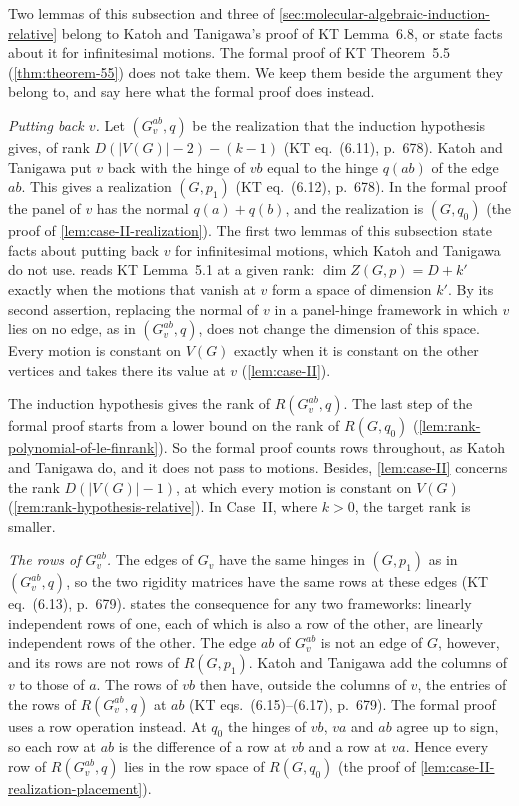 \begin{remark}
  \label{rem:case-II-kt-steps}
  Two lemmas of this subsection and three of
  \cref{sec:molecular-algebraic-induction-relative} belong to Katoh and
  Tanigawa's proof of KT Lemma~6.8, or state facts about it for
  infinitesimal motions. The formal proof of KT Theorem~5.5
  (\cref{thm:theorem-55}) does not take them. We keep them beside the
  argument they belong to, and say here what the formal proof does
  instead.

  \emph{Putting back $v$.} Let $(G_v^{ab}, q)$ be the realization that
  the induction hypothesis gives, of rank $D(|V(G)| - 2) - (k - 1)$ (KT
  eq.~(6.11), p.~678). Katoh and Tanigawa put $v$ back with the hinge
  of $vb$ equal to the hinge $q(ab)$ of the edge $ab$. This gives a
  realization $(G, p_1)$ (KT eq.~(6.12), p.~678). In the formal proof
  the panel of $v$ has the normal $q(a) + q(b)$, and the realization is
  $(G, q_0)$ (the proof of \cref{lem:case-II-realization}). The first
  two lemmas of this subsection state facts about putting back $v$ for
  infinitesimal motions, which Katoh and Tanigawa do not use.
   reads KT Lemma~5.1 at a given rank:
  $\dim Z(G,p) = D + k'$ exactly when the motions that vanish at $v$
  form a space of dimension $k'$. By its second assertion, replacing the
  normal of $v$ in a panel-hinge framework in which $v$ lies on no edge,
  as in $(G_v^{ab}, q)$, does not change the dimension of this space.
  Every motion is constant on $V(G)$ exactly when it is constant on the
  other vertices and takes there its value at $v$ (\cref{lem:case-II}).

  The induction hypothesis gives the rank of $R(G_v^{ab}, q)$. The last
  step of the formal proof starts from a lower bound on the rank of
  $R(G, q_0)$ (\cref{lem:rank-polynomial-of-le-finrank}). So the formal
  proof counts rows throughout, as Katoh and Tanigawa do, and it does not
  pass to motions. Besides, \cref{lem:case-II} concerns the rank
  $D(|V(G)| - 1)$, at which every motion is constant on $V(G)$
  (\cref{rem:rank-hypothesis-relative}). In Case~II, where $k > 0$, the
  target rank is smaller.

  \emph{The rows of $G_v^{ab}$.} The edges of $G_v$ have the same hinges
  in $(G, p_1)$ as in $(G_v^{ab}, q)$, so the two rigidity matrices
  have the same rows at these edges (KT eq.~(6.13), p.~679).
   states the consequence for any
  two frameworks: linearly independent rows of one, each of which is
  also a row of the other, are linearly independent rows of the other.
  The edge $ab$ of $G_v^{ab}$ is not an edge of $G$, however, and its
  rows are not rows of $R(G, p_1)$. Katoh and Tanigawa add the columns
  of $v$ to those of $a$. The rows of $vb$ then have, outside the
  columns of $v$, the entries of the rows of $R(G_v^{ab}, q)$ at $ab$
  (KT eqs.~(6.15)--(6.17), p.~679). The formal proof uses a row
  operation instead. At $q_0$ the hinges of $vb$, $va$ and $ab$ agree up
  to sign, so each row at $ab$ is the difference of a row at $vb$ and a
  row at $va$. Hence every row of $R(G_v^{ab}, q)$ lies in the row space
  of $R(G, q_0)$ (the proof of \cref{lem:case-II-realization-placement}).


\end{remark}
